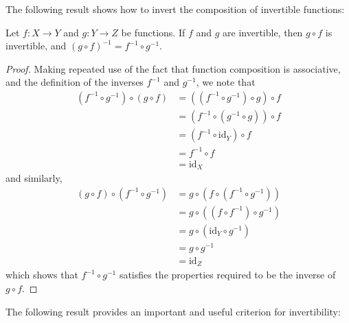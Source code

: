 The following result shows how to invert the composition of invertible functions:

\begin{proposition}
Let $f:X \to Y$ and $g:Y \to Z$ be functions. If $f$ and $g$ are invertible, then $g \circ f$ is invertible, and $(g \circ f)^{-1} = f^{-1} \circ g^{-1}$.
\end{proposition}
\begin{proof}
Making repeated use of the fact that function composition is associative, and the definition of the inverses $f^{-1}$ and $g^{-1}$, we note that
\begin{align*}
(f^{-1}\circ g^{-1}) \circ (g \circ f) 
&= ((f^{-1} \circ g^{-1}) \circ g) \circ f \\
&= (f^{-1} \circ (g^{-1} \circ g)) \circ f \\
&= (f^{-1} \circ \mathrm{id}_Y) \circ f \\
&= f^{-1} \circ f \\
&= \mathrm{id}_X
\end{align*}
and similarly,
\begin{align*}
(g \circ f) \circ (f^{-1} \circ g^{-1}) 
&= g \circ (f \circ (f^{-1} \circ g^{-1})) \\
&= g \circ ((f \circ f^{-1}) \circ g^{-1}) \\
&= g \circ (\mathrm{id}_Y \circ g^{-1}) \\
&= g \circ g^{-1} \\
&= \mathrm{id}_Z
\end{align*}
which shows that $f^{-1} \circ g^{-1}$ satisfies the properties required to be the inverse of $g \circ f$.
\end{proof}

The following result provides an important and useful criterion for invertibility:


